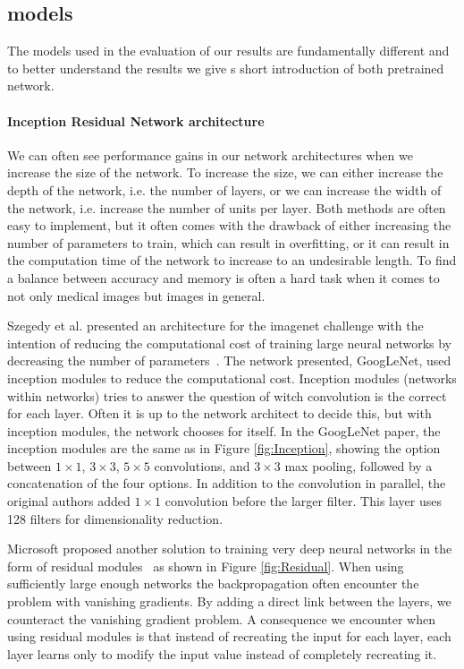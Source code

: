 \subsection{models}
The models used in the evaluation of our results are fundamentally different and to better understand the results we give s short introduction of both pretrained network. 

\paragraph{Inception Residual Network architecture }
We can often see performance gains in our network architectures when we increase the size of the network. To increase the size, we can either increase the depth of the network, i.e. the number of layers, or we can increase the width of the network, i.e. increase the number of units per layer. Both methods are often easy to implement, but it often comes with the drawback of either increasing the number of parameters to train, which can result in overfitting, or it can result in the computation time of the network to increase to an undesirable length.
To find a balance between accuracy and memory is often a hard task when it comes to not only medical images but images in general.

Szegedy et al. presented an architecture for the imagenet challenge with the intention of reducing the computational cost of training large neural networks by decreasing the number of parameters~\cite{DBLP:journals/corr/SzegedyLJSRAEVR14}. 
The network presented, GoogLeNet, used inception modules to reduce the computational cost.  Inception modules (networks within networks) tries to answer the question of witch convolution is the correct for each layer. Often it is up to the network architect to decide this, but with inception modules, the network chooses for itself. 
In the GoogLeNet paper, the inception modules are the same as in Figure \ref{fig:Inception}, showing the option between $1 \times 1$, $3 \times 3$, $5 \times 5$ convolutions, and $3 \times 3$ max pooling, followed by a concatenation of the four options. In addition to the convolution in parallel, the original authors added $1 \times 1$ convolution before the larger filter. This layer uses 128 filters for dimensionality reduction.


Microsoft proposed another solution to training very deep neural networks in the form of residual modules~\cite{DBLP:journals/corr/HeZRS15} as shown in Figure \ref{fig:Residual}.
When using sufficiently large enough networks the backpropagation often encounter the problem with vanishing gradients. By adding a direct link between the layers, we counteract the vanishing gradient problem. A consequence we encounter when using residual modules is that instead of recreating the input for each layer, each layer learns only to modify the input value instead of completely recreating it.

